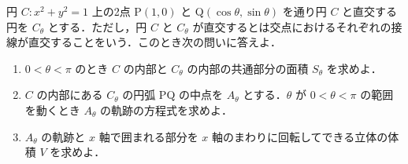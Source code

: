 \documentclass[a4paper,10pt]{ltjsarticle}
\begin{document}
\begin{oframed}
円 $C: x^2+y^2=1$ 上の2点 P$(1,0)$ と Q$(\cos\theta, \sin\theta)$ を通り円 $C$ と直交する円を $C_\theta$ とする．ただし，円 $C$ と $C_\theta$ が直交するとは交点におけるそれぞれの接線が直交することをいう．このとき次の問いに答えよ．

\begin{enumerate}
    \item $0 < \theta < \pi$ のとき $C$ の内部と $C_\theta$ の内部の共通部分の面積 $S_\theta$ を求めよ．
    \item $C$ の内部にある $C_\theta$ の円弧 PQ の中点を $A_\theta$ とする．$\theta$ が $0 < \theta < \pi$ の範囲を動くとき $A_\theta$ の軌跡の方程式を求めよ．
    \item $A_\theta$ の軌跡と $x$ 軸で囲まれる部分を $x$ 軸のまわりに回転してできる立体の体積 $V$ を求めよ．
\end{enumerate}

\end{oframed}
\setlength{\columnseprule}{0.4pt}
\end{document}

